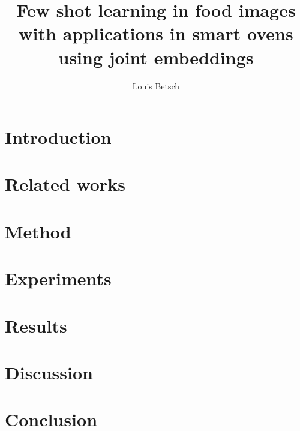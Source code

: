 \documentclass[12pt]{article}
\title{Few shot learning in food images with applications in smart ovens using joint embeddings}
\author{Louis Betsch}
\begin{document}
\onehalfspacing

\maketitle


\clearpage

\tableofcontents
\clearpage

\printnoidxglossary[type=\acronymtype]
\clearpage

\section{Introduction}
\label{sec:introduction}


\section{Related works}
\label{sec:related_works}


\section{Method}
\label{sec:method}


\section{Experiments}
\label{sec:experiments}


\section{Results}
\label{sec:results}


\section{Discussion}
\label{sec:discussion}


\section{Conclusion}
\label{sec:conclusion}



\clearpage

\printbibliography
\end{document}
